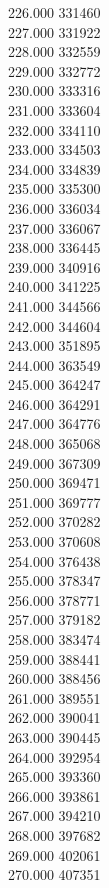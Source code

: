 { 226.000	331460 \\
 227.000	331922 \\
 228.000	332559 \\
 229.000	332772 \\
 230.000	333316 \\
 231.000	333604 \\
 232.000	334110 \\
 233.000	334503 \\
 234.000	334839 \\
 235.000	335300 \\
 236.000	336034 \\
 237.000	336067 \\
 238.000	336445 \\
 239.000	340916 \\
 240.000	341225 \\
 241.000	344566 \\
 242.000	344604 \\
 243.000	351895 \\
 244.000	363549 \\
 245.000	364247 \\
 246.000	364291 \\
 247.000	364776 \\
 248.000	365068 \\
 249.000	367309 \\
 250.000	369471 \\
 251.000	369777 \\
 252.000	370282 \\
 253.000	370608 \\
 254.000	376438 \\
 255.000	378347 \\
 256.000	378771 \\
 257.000	379182 \\
 258.000	383474 \\
 259.000	388441 \\
 260.000	388456 \\
 261.000	389551 \\
 262.000	390041 \\
 263.000	390445 \\
 264.000	392954 \\
 265.000	393360 \\
 266.000	393861 \\
 267.000	394210 \\
 268.000	397682 \\
 269.000	402061 \\
 270.000	407351 \\
}
